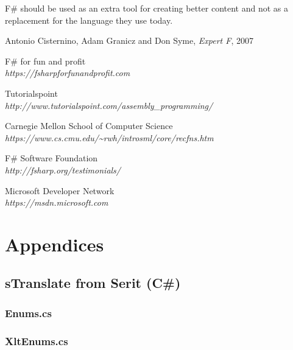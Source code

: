 \documentclass[12pt, a4paper]{article}
\begin{document}
F\# should be used as an extra tool for creating better content and not as a replacement for the language they use today. 

\newpage



\begin{thebibliography}{9}

Antonio Cisternino, Adam Granicz and Don Syme,
\textit{Expert F}, 
2007

F\# for fun and profit\\
\emph{https://fsharpforfunandprofit.com}

Tutorialspoint\\
\emph{http://www.tutorialspoint.com/assembly\_programming/}

Carnegie Mellon School of Computer Science\\
\emph{https://www.cs.cmu.edu/\textasciitilde rwh/introsml/core/recfns.htm}

F\# Software Foundation\\
\emph{http://fsharp.org/testimonials/}

Microsoft Developer Network\\
\emph{https://msdn.microsoft.com}


 
\end{thebibliography}
\newpage

\appendix
\footnotesize
\section{Appendices}	
\subsection{sTranslate from Serit (C\#)}
\label{AppendixCSharp}
\subsubsection{Enums.cs}

\newpage
\subsubsection{XltEnums.cs}

\newpage
\end{document}
